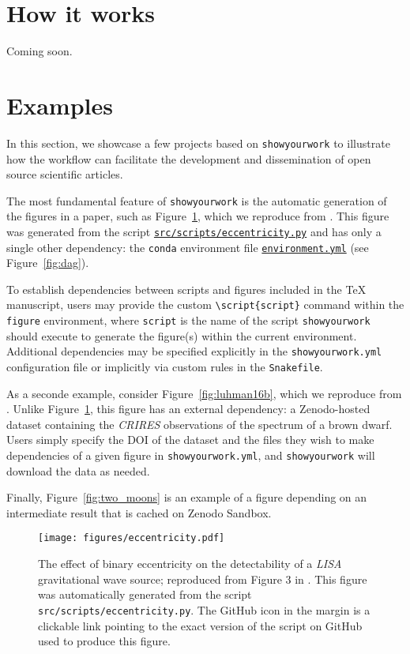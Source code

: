 \documentclass[modern]{aastex631}
\newcommand\syw{\texttt{showyourwork}\xspace}
\newcommand\repourl{https://github.com/showyourwork/showyourwork-paper}
\newcommand\fileurl[1]{\repourl/blob/\GitHubSHA/#1}
\begin{document}
\section{How it works}
\label{sec:how-it-works}
Coming soon.

\section{Examples}
\label{sec:examples}

In this section, we showcase a few projects based on \syw to illustrate how the workflow can facilitate the development and dissemination of open source scientific articles.

The most fundamental feature of \syw is the automatic generation of the figures in a paper, such as Figure~\ref{fig:eccentricity}, which we reproduce from \citet{Wagg2022}.
This figure was generated from the script \href{\fileurl{src/scripts/eccentricity.py}}{\texttt{src/scripts/eccentricity.py}} and has only a single other dependency: the \texttt{conda} environment file \href{\fileurl{environment.yml}}{\texttt{environment.yml}} (see Figure~\ref{fig:dag}).

To establish dependencies between scripts and figures included in the TeX manuscript, users may provide the custom \texttt{\textbackslash script\{{\color{lsthilite}script}\}} command within the \texttt{figure} environment, where \texttt{\color{lsthilite}script} is the name of the script \syw should execute to generate the figure(s) within the current environment.
Additional dependencies may be specified explicitly in the \texttt{showyourwork.yml} configuration file or implicitly via custom rules in the \texttt{Snakefile}.

As a seconde example, consider Figure~\ref{fig:luhman16b}, which we reproduce from \citet{Luger2021}. 
Unlike Figure~\ref{fig:eccentricity}, this figure has an external dependency: a Zenodo-hosted dataset containing the \emph{CRIRES} observations of the spectrum of a brown dwarf.
Users simply specify the DOI of the dataset and the files they wish to make dependencies of a given figure in \texttt{showyourwork.yml}, and \syw will download the data as needed.

Finally, Figure~\ref{fig:two_moons} is an example of a figure depending on an intermediate result that is cached on Zenodo Sandbox.

\clearpage

\begin{figure}[p!]
    \begin{centering}
        \texttt{[image: figures/eccentricity.pdf]}
        \caption{
            The effect of binary eccentricity on the detectability of a \emph{LISA} gravitational wave source; reproduced from Figure 3 in \citet{Wagg2022}. 
            This figure was automatically generated from the script \texttt{src/scripts/eccentricity.py}.
            The GitHub icon in the margin is a clickable link pointing to the exact version of the script on GitHub used to produce this figure.
        }
        \label{fig:eccentricity}
    \end{centering}
\end{figure}
\end{document}
